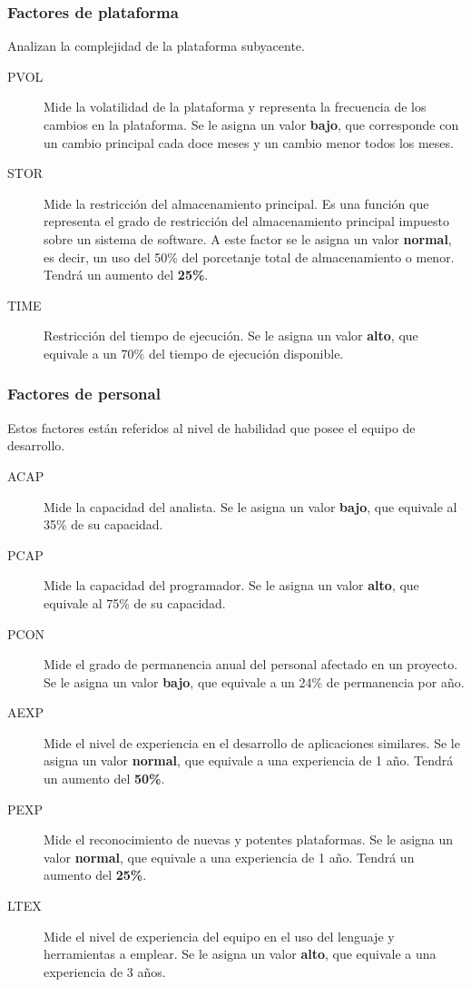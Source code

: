 \documentclass[11pt,a4paper,spanish,twoside]{report}
\begin{document}
\subsubsection{Factores de plataforma}
Analizan la complejidad de la plataforma subyacente.
\begin{description}
\item[PVOL] Mide la volatilidad de la plataforma y representa la frecuencia de
  los cambios en la plataforma. Se le asigna un valor \textbf{bajo}, que
  corresponde con un cambio principal cada doce meses y un cambio menor todos
  los meses.

\item[STOR] Mide la restricción del almacenamiento principal. Es una función
  que representa el grado de restricción del almacenamiento principal
  impuesto sobre un sistema de software. A este factor se le asigna un valor
  \textbf{normal}, es decir, un uso del 50\% del porcetanje total de
  almacenamiento o menor. Tendrá un aumento del \textbf{25\%}.

\item[TIME] Restricción del tiempo de ejecución. Se le asigna un valor
  \textbf{alto}, que equivale a un 70\% del tiempo de ejecución disponible.
\end{description}

\subsubsection{Factores de personal}
Estos factores están referidos al nivel de habilidad que posee el equipo de
desarrollo.
\begin{description}
\item[ACAP] Mide la capacidad del analista. Se le asigna un valor
\textbf{bajo}, que equivale al 35\% de su capacidad.
\item[PCAP] Mide la capacidad del programador. Se le asigna un valor
\textbf{alto}, que equivale al 75\% de su capacidad.
\item[PCON] Mide el grado de permanencia anual del personal afectado en un
proyecto. Se le asigna un valor \textbf{bajo}, que equivale a un 24\% de
permanencia por año.
\item[AEXP] Mide el nivel de experiencia en el desarrollo de aplicaciones
similares. Se le asigna un valor \textbf{normal}, que equivale a una
experiencia de 1 año. Tendrá un aumento del \textbf{50\%}.
\item[PEXP] Mide el reconocimiento de nuevas y potentes plataformas. Se le
asigna un valor \textbf{normal}, que equivale a una experiencia de 1
año. Tendrá un aumento del \textbf{25\%}. 
\item[LTEX] Mide el nivel de experiencia del equipo en el uso del lenguaje y
herramientas a emplear. Se le asigna un valor \textbf{alto}, que equivale a una
experiencia de 3 años.
\end{description}
\end{document}
